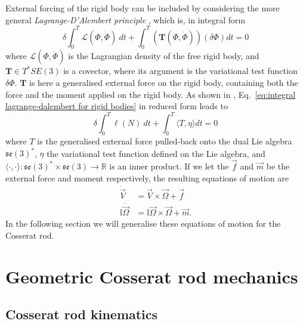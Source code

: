 External forcing of the rigid body can be included by considering the more general \textit{Lagrange-D'Alembert principle} \citep{marsdenIntroductionMechanicsSymmetry2013}, which is, in integral form
\begin{equation} \label{eq:integral lagrange-dalembert for rigid bodies}
\delta \int_0^T \mathcal{L}(\Phi, \dot{\Phi})\ dt + \int_0^T (\mathbf{T}(\Phi, \dot{\Phi}))( \delta \Phi ) dt = 0
\end{equation}
where $\mathcal{L}(\Phi, \dot{\Phi})$ is the Lagrangian density of the free rigid body, and $\mathbf{T} \in T^*SE(3)$ is a covector, where its argument is the variational test function $\delta \Phi$. $\mathbf{T}$ is here a generalised external force on the rigid body, containing both the force and the moment applied on the rigid body. As shown in \cite{wisniewskiEulerPoincarReductionExternally}, Eq.~\ref{eq:integral lagrange-dalembert for rigid bodies} in reduced form leads to
\begin{equation} \label{eq:reduced integral lagrange-dalembert for rigid bodies}
\delta \int_0^T \ell (N)\ dt + \int_0^T \langle T, \eta \rangle dt = 0
\end{equation}
where $T$ is the generalised external force pulled-back onto the dual Lie algebra $\mathfrak{se}(3)^*$, $\eta$ the variational test function defined on the Lie algebra, and $\langle \cdot , \cdot \rangle : \mathfrak{se}(3)^* \times \mathfrak{se}(3) \to \mathbb{R}$ is an inner product. If we let the $\vec{f}$ and $\vec{m}$ be the external force and moment respectively, the resulting equations of motion are
\begin{subequations} 
\begin{align} 
\dot{\vec{V}} & = \vec{V} \times \vec{\Omega} + \vec{f}  \\
\mathbb{I} \dot{\vec{\Omega}} & = \mathbb{I} \vec{\Omega} \times \vec{\Omega} + \vec{m}.
\end{align}
\end{subequations}
In the following section we will generalise these equations of motion for the Cosserat rod.

\section{Geometric Cosserat rod mechanics} \label{sec:Geometric Cosserat rod mechanics}

\subsection{Cosserat rod kinematics}


